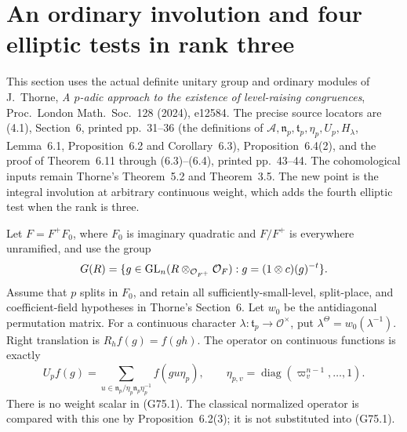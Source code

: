 \section{An ordinary involution and four elliptic tests in rank three}
\label{sec:cubic-ordinary-involution}

This section uses the actual definite unitary group and ordinary modules of
J.~Thorne, \emph{A \(p\)-adic approach to the existence of level-raising
congruences}, Proc.\ London Math.\ Soc.\ 128 (2024), e12584.
The precise source locators are (4.1), Section~6, printed pp.~31--36
(the definitions of \(\mathcal A,\mathfrak n_p,\mathfrak t_p,\eta_p,U_p,H_\lambda\),
Lemma~6.1, Proposition~6.2 and Corollary~6.3), Proposition~6.4(2),
and the proof of Theorem~6.11 through (6.3)--(6.4), printed pp.~43--44.
The cohomological inputs remain Thorne's Theorem~5.2 and Theorem~3.5.
The new point is the integral involution at arbitrary continuous weight,
which adds the fourth elliptic test when the rank is three.

Let \(F=F^+F_0\), where \(F_0\) is imaginary quadratic and
\(F/F^+\) is everywhere unramified, and use the group
\[
 G(R)=\{g\in {\rm GL}_n(R\otimes_{\mathcal O_{F^+}}\mathcal O_F):
                  g=(1\otimes c)(g)^{-t}\}.
\]
Assume that \(p\) splits in \(F_0\), and retain all sufficiently-small-level,
split-place, and coefficient-field hypotheses in Thorne's Section~6.
Let \(w_0\) be the antidiagonal permutation matrix.
For a continuous character
\(\lambda:\mathfrak t_p\longrightarrow\mathcal O^\times\), put
\(\lambda^\Theta=w_0(\lambda^{-1})\).
Right translation is \(R_hf(g)=f(gh)\).
The operator on continuous functions is exactly
\[
 U_pf(g)=\sum_{u\in\mathfrak n_p/
                     \eta_p\mathfrak n_p\eta_p^{-1}}f(gu\eta_p),
 \qquad
 \eta_{p,v}=\operatorname{diag}(\varpi_v^{n-1},\ldots,1).
 \tag{G75.1}
\]
There is no weight scalar in (G75.1).
The classical normalized operator is compared with this one by
Proposition~6.2(3); it is not substituted into (G75.1).

